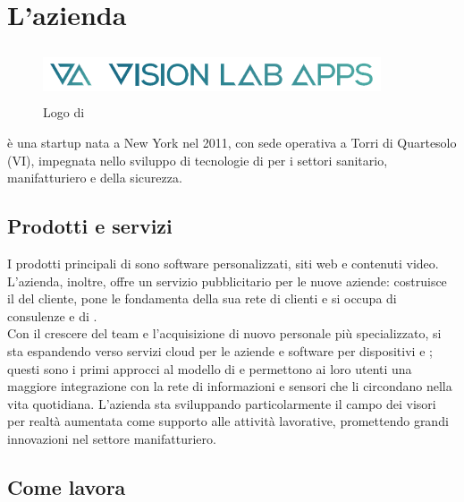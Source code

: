 \chapter{L'azienda\label{cap:lazienda}}
\begin{figure}[H]
   \begin{center}
      \includegraphics[width=10cm,height=1.5cm,keepaspectratio]{immagini/vla-logo}
   \end{center}
   \caption{Logo di \nomeAzienda{}}\label{logovla}
\end{figure}
\nomeAziendaComm{} è una startup nata a New York nel 2011, con sede operativa a Torri di Quartesolo (VI), impegnata nello sviluppo di tecnologie di  per i settori sanitario, manifatturiero e della sicurezza.

\section{Prodotti e servizi}
I prodotti principali di \nomeAzienda{} sono software personalizzati, siti web e contenuti video. L'azienda, inoltre, offre un servizio pubblicitario per le nuove aziende: costruisce il  del cliente, pone le fondamenta della sua rete di clienti e si occupa di consulenze e di .
\\
Con il crescere del team e l'acquisizione di nuovo personale più specializzato, \nomeAzienda{} si sta espandendo verso servizi cloud per le aziende e software per dispositivi  e ; questi sono i primi approcci al modello di  e permettono ai loro utenti una maggiore integrazione con la rete di informazioni e sensori che li circondano nella vita quotidiana. L'azienda sta sviluppando particolarmente il campo dei visori per realtà aumentata come supporto alle attività lavorative, promettendo grandi innovazioni nel settore manifatturiero.

\section{Come lavora}
 
